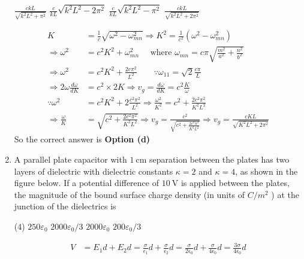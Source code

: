 \begin{enumerate}
\begin{tasks}
	\task[\textbf{a.}]$\frac{c k L}{\sqrt{k^{2} L^{2}+\pi^{2}}}$
	\task[\textbf{b.}]$\frac{c}{k L} \sqrt{k^{2} L^{2}-2 \pi^{2}}$
	\task[\textbf{c.}]$\frac{c}{k L} \sqrt{k^{2} L^{2}-\pi^{2}}$
	\task[\textbf{d.}]  $\frac{c k L}{\sqrt{k^{2} L^{2}+2 \pi^{2}}}$
\end{tasks}
\begin{answer}
	\begin{align*}
	K&=\frac{1}{c} \sqrt{\omega^{2}-\omega_{m n}^{2}} \Rightarrow K^{2}=\frac{1}{c^{2}}\left(\omega^{2}-\omega_{m n}^{2}\right)\\
	\Rightarrow \omega^{2}&=c^{2} K^{2}+\omega_{m n}^{2} \quad \text { where } \omega_{m n}=c \pi \sqrt{\frac{m^{2}}{a^{2}}+\frac{n^{2}}{b^{2}}} \\
	\Rightarrow \omega^{2}&=c^{2} K^{2}+\frac{2 c \pi^{2}}{L^{2}} \qquad \because \omega_{11}=\sqrt{2} \frac{c \pi}{L}\\
	\Rightarrow 2 \omega \frac{d \omega}{d K}&=c^{2} \times 2 K \Rightarrow v_{g}=\frac{d \omega}{d K}=c^{2} \frac{K}{\omega} \\
	\because \omega^{2}&=c^{2} K^{2}+2 \frac{c^{2} \pi^{2}}{L^{2}} \Rightarrow \frac{\omega^{2}}{K^{2}}=c^{2}+\frac{2 c^{2} \pi^{2}}{K^{2} L^{2}} \\
	\Rightarrow \frac{\omega}{K}&=\sqrt{c^{2}+\frac{2 c^{2} \pi^{2}}{K^{2} L^{2}}} \Rightarrow v_{g}=\frac{c^{2}}{\sqrt{c^{2}+\frac{2 c^{2} \pi^{2}}{K^{2} L^{2}}}} \Rightarrow v_{g}=\frac{c K L}{\sqrt{K^{2} L^{2}+2 \pi^{2}}}
	\end{align*}
		So the correct answer is \textbf{Option (d)}
\end{answer}
\item A parallel plate capacitor with $1 \mathrm{~cm}$ separation between the plates has two layers of dielectric with dielectric constants $\kappa=2$ and $\kappa=4$, as shown in the figure below. If a potential difference of $10 \mathrm{~V}$ is applied between the plates, the magnitude of the bound surface charge density (in units of $C / m^{2}$ ) at the junction of the dielectrics is
 \begin{tasks}(4)
	\task[\textbf{a.}]$250 \varepsilon_{0}$
	\task[\textbf{b.}]$2000 \varepsilon_{0} / 3$
	\task[\textbf{c.}] $2000 \varepsilon_{0}$
	\task[\textbf{d.}] $200 \varepsilon_{0} / 3$
\end{tasks}
\begin{answer}
	\begin{align*}
	V&=E_{1} d+E_{2} d=\frac{\sigma}{\epsilon_{1}} d+\frac{\sigma}{\epsilon_{2}} d=\frac{\sigma}{2 \epsilon_{0}} d+\frac{\sigma}{4 \epsilon_{0}} d=\frac{3 \sigma}{4 \epsilon_{0}} d\\

\end{align*}
\end{answer}
\end{enumerate}
